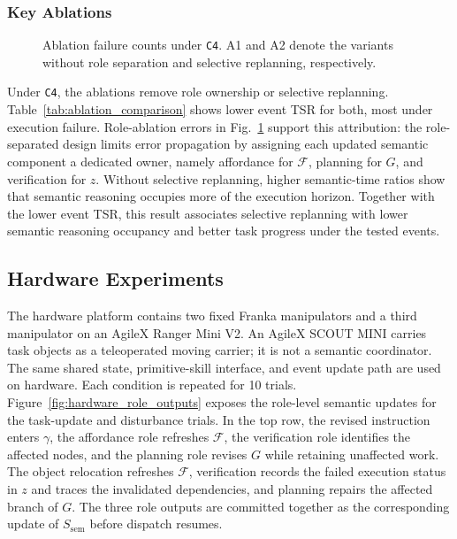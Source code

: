 \subsubsection{Key Ablations}



\begin{figure}[!t]
  \centering
  
  \vspace{-0.1in}
  \caption{Ablation failure counts under \texttt{C4}. A1 and A2 denote the
  variants without role separation and selective replanning, respectively.}
  \label{fig:ablation_failure_count}
\end{figure}






Under \texttt{C4}, the ablations remove role ownership or selective replanning.
Table~\ref{tab:ablation_comparison} shows lower event TSR for both, most under
execution failure. Role-ablation errors in
Fig.~\ref{fig:ablation_failure_count} support this attribution: the
role-separated design limits error propagation by assigning each updated
semantic component a dedicated owner, namely affordance for $\mathcal{F}$,
planning for $G$, and verification for $z$. Without selective replanning,
higher semantic-time ratios show that semantic reasoning occupies more of the
execution horizon. Together with the lower event TSR, this result associates
selective replanning with lower semantic reasoning occupancy and better task
progress under the tested events.

\subsection{Hardware Experiments}
\label{sec:hardware_experiments}

The hardware platform contains two fixed Franka manipulators and a third
manipulator on an AgileX Ranger Mini V2. An AgileX SCOUT MINI carries task
objects as a teleoperated moving carrier; it is not a semantic coordinator.
The same shared state, primitive-skill interface, and event update path are
used on hardware. Each condition is repeated for 10 trials.
Figure~\ref{fig:hardware_role_outputs} exposes the role-level semantic updates
for the task-update and disturbance trials. In the top row, the revised
instruction enters $\gamma$, the affordance role refreshes $\mathcal{F}$, the
verification role identifies the affected nodes, and the planning role revises
$G$ while retaining unaffected work. The object relocation
refreshes $\mathcal{F}$, verification records the failed execution status in
$z$ and traces the invalidated dependencies, and planning repairs the affected
branch of $G$. The three role outputs are committed together as the
corresponding update of $S_{\mathrm{sem}}$ before dispatch resumes.




